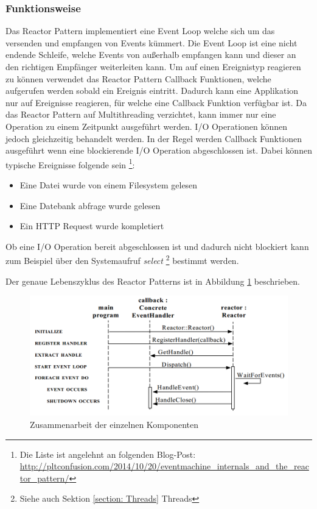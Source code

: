 \subsubsection{Funktionsweise}

Das Reactor Pattern implementiert eine Event Loop welche sich um das versenden und empfangen von Events kümmert. Die Event Loop ist eine nicht endende Schleife, welche Events von außerhalb empfangen kann und dieser an den richtigen Empfänger weiterleiten kann. Um auf einen Ereignistyp reagieren zu können verwendet das Reactor Pattern Callback Funktionen, welche aufgerufen werden sobald ein Ereignis eintritt. Dadurch kann eine Applikation nur auf Ereignisse reagieren, für welche eine Callback Funktion verfügbar ist. Da das Reactor Pattern auf Multithreading verzichtet, kann immer nur eine Operation zu einem Zeitpunkt ausgeführt werden. I/O Operationen können jedoch gleichzeitig behandelt werden. In der Regel werden Callback Funktionen ausgeführt wenn eine blockierende I/O Operation abgeschlossen ist. Dabei können typische Ereignisse folgende sein \footnote{Die Liste ist angelehnt an folgenden Blog-Post: \url{http://pltconfusion.com/2014/10/20/eventmachine_internals_and_the_reactor_pattern/}}:

\begin{itemize}
  \item Eine Datei wurde von einem Filesystem gelesen
  \item Eine Datebank abfrage wurde gelesen
  \item Ein HTTP Request wurde kompletiert
\end{itemize}

Ob eine I/O Operation bereit abgeschlossen ist und dadurch nicht blockiert kann zum Beispiel über den Systemaufruf \emph{select} \footnote{Siehe auch Sektion \ref{section: Threads} Threads} bestimmt werden.

Der genaue Lebenszyklus des Reactor Patterns ist in Abbildung \ref{figure:reactor_cycle} beschrieben.

\begin{figure}[!htb]
  \centering
  \includegraphics[width=13cm]{images/reactor.png}
  \caption{
    Zusammenarbeit der einzelnen Komponenten \cite[p. 5]{Sch95}
  }
  \label{figure:reactor_cycle}
\end{figure}

